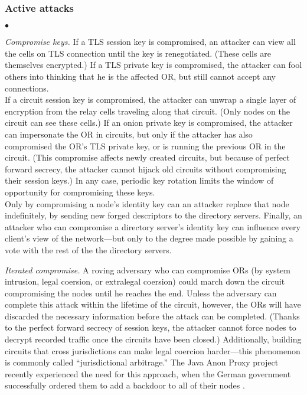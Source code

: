 \documentclass[times,10pt,twocolumn]{article}
\newenvironment{tightlist}{\begin{list}{$\bullet$}{
  \setlength{\itemsep}{0mm}
    \setlength{\parsep}{0mm}
    }}{\end{list}}
\begin{document}
\subsubsection*{Active attacks}
\begin{tightlist}
\item \emph{Compromise keys.}
  If a TLS session key is compromised, an attacker
  can view all the cells on TLS connection until the key is
  renegotiated.  (These cells are themselves encrypted.)  If a TLS
  private key is compromised, the attacker can fool others into
  thinking that he is the affected OR, but still cannot accept any
  connections. \\
  If a circuit session key is compromised, the
  attacker can unwrap a single layer of encryption from the relay
  cells traveling along that circuit.  (Only nodes on the circuit can
  see these cells.) If an onion private key is compromised, the attacker
  can impersonate the OR in circuits, but only if the attacker has
  also compromised the OR's TLS private key, or is running the
  previous OR in the circuit.  (This compromise affects newly created
  circuits, but because of perfect forward secrecy, the attacker
  cannot hijack old circuits without compromising their session keys.)
  In any case, periodic key rotation limits the window of opportunity
  for compromising these keys. \\
  Only by
  compromising a node's identity key can an attacker replace that
  node indefinitely, by sending new forged descriptors to the
  directory servers.  Finally, an attacker who can compromise a
  directory server's identity key can influence every client's view
  of the network---but only to the degree made possible by gaining a
  vote with the rest of the the directory servers.

\item \emph{Iterated compromise.} A roving adversary who can
  compromise ORs (by system intrusion, legal coersion, or extralegal
  coersion) could march down the circuit compromising the
  nodes until he reaches the end.  Unless the adversary can complete
  this attack within the lifetime of the circuit, however, the ORs
  will have discarded the necessary information before the attack can
  be completed.  (Thanks to the perfect forward secrecy of session
  keys, the attacker cannot force nodes to decrypt recorded
  traffic once the circuits have been closed.)  Additionally, building
  circuits that cross jurisdictions can make legal coercion
  harder---this phenomenon is commonly called ``jurisdictional
  arbitrage.'' The Java Anon Proxy project recently experienced the
  need for this approach, when
  the German government successfully ordered them to add a backdoor to
  all of their nodes \cite{jap-backdoor}.
  

\end{tightlist}
\end{document}
